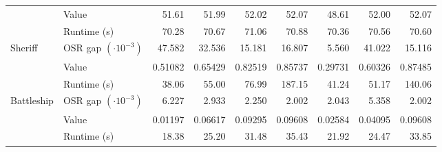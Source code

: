 \begin{table}[t]
\begin{tabular*}{\textwidth}{@{\extracolsep{\fill}}llrrrrrrr@{}}
 & Value & 51.61 & 51.99 & 52.02 & 52.07 & 48.61 & 52.00 & 52.07\\
 & Runtime (s) & 70.28 & 70.67 & 71.06 & 70.88 & 70.36 & 70.56 & 70.60\\
\hline
Sheriff & OSR gap \((\cdot10^{-3})\) & 47.582 & 32.536 & 15.181 & 16.807 & 5.560 & 41.022 & 15.116\\
 & Value & 0.51082 & 0.65429 & 0.82519 & 0.85737 & 0.29731 & 0.60326 & 0.87485\\
 & Runtime (s) & 38.06 & 55.00 & 76.99 & 187.15 & 41.24 & 51.17 & 140.06\\
\hline
Battleship & OSR gap \((\cdot10^{-3})\) & 6.227 & 2.933 & 2.250 & 2.002 & 2.043 & 5.358 & 2.002\\
 & Value & 0.01197 & 0.06617 & 0.09295 & 0.09608 & 0.02584 & 0.04095 & 0.09608\\
 & Runtime (s) & 18.38 & 25.20 & 31.48 & 35.43 & 21.92 & 24.47 & 33.85\\
\hline
\end{tabular*}
\end{table}
